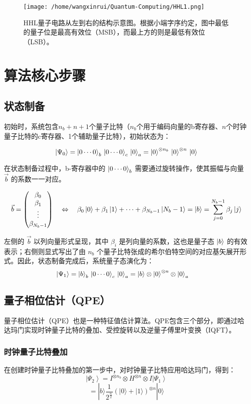 \documentclass{article}
\begin{document}
\begin{figure}[htbp]
    \centering
    \texttt{[image: /home/wangxinrui/Quantum-Computing/HHL1.png]}
    \caption{HHL量子电路从左到右的结构示意图。根据小端字序约定，图中最低的量子位是最高有效位（MSB），而最上方的则是最低有效位（LSB）。}
\end{figure}
\section{算法核心步骤}
\subsection{状态制备}
初始时，系统包含\( n_b + n + 1 \)个量子比特（\( n_b \)个用于编码向量的b寄存器、\( n \)个时钟量子比特的c寄存器、1个辅助量子比特），初始状态为：

\[\ket{\Psi_0} 
= \ket{0 \cdots 0}_b \, \ket{0 \cdots 0}_c \, \ket{0}_a 
= \ket{0}^{\otimes n_b} \, \ket{0}^{\otimes n} \, \ket{0}\]

在状态制备过程中，b-寄存器中的 \(\ket{0 \cdots 0}_b\) 需要通过旋转操作，使其振幅与向量 \(\vec{b}\) 的系数一一对应。

\[
\vec{b} 
= \begin{pmatrix} 
\beta_0 \\ 
\beta_1 \\ 
\vdots \\ 
\beta_{N_b - 1} 
\end{pmatrix} 
\quad\Leftrightarrow\quad 
\beta_0\ket{0} + \beta_1\ket{1} + \cdots + \beta_{N_b - 1}\ket{N_b - 1} 
= \ket{b}= \sum_{j=0}^{N_b-1} \beta_j \ket{j}
\]

左侧的 \(\vec{b}\) 以列向量形式呈现，其中 \(\beta_i\) 是列向量的系数，这也是量子态 \(\ket{b}\) 的有效表示；右侧则显式写出了由 \( n_b \) 个量子比特张成的希尔伯特空间的对应基矢展开形式。因此，状态制备完成后，系统量子态演化为：
\[
\ket{\Psi_1} 
= \ket{b}_b \, \ket{0 \cdots 0}_c \, \ket{0}_a = \ket{b} \otimes \ket{0}^{\otimes n} \otimes \ket{0}_a \quad \text{}
\]
\subsection{量子相位估计（QPE）}
量子相位估计（QPE）也是一种特征值估计算法。QPE包含三个部分，即通过哈达玛门实现时钟量子比特的叠加、受控旋转以及逆量子傅里叶变换（IQFT）。
\subsubsection{时钟量子比特叠加}
在创建时钟量子比特叠加的第一步中，对时钟量子比特应用哈达玛门，得到：
\[
\left|\Psi_{2}\right>=I^{\otimes n_{b}} \otimes H^{\otimes n} \otimes I\left|\Psi_{1}\right>
\]
\[
=|b\rangle \frac{1}{2^{\frac{n}{2}}}{\left(|0\rangle+|1\rangle\right)}^{\otimes n}|0\rangle
\]
\end{document}
